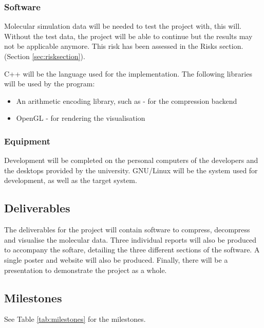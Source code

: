 \documentclass[a4paper,twocolumn]{article}
\begin{document}
\subsubsection{Software}
Molecular simulation data will be needed to test the project with, this will.
Without the test data, the project will be able to
continue but the results may not be applicable anymore. This risk has been
assessed in the Risks section. (Section \ref{sec:risksection}).

C++ will be the language used for the implementation. The following libraries
will be used by the program:
\begin{itemize}
 \item An arithmetic encoding library, such as \citep{AC} - for the compression backend 
 \item OpenGL - for rendering the visualisation
\end{itemize}


\subsubsection{Equipment}

Development will be completed on the personal computers of the developers and
the desktops provided by the university. GNU/Linux will be the system used for
development, as well as the target system.


\subsection{Deliverables}

The deliverables for the project will contain software to compress, decompress
and visualise the molecular data. Three individual reports will also be
produced to accompany the softare, detailing the three different sections of
the software. A single poster and website will also be produced. Finally, there
will be a presentation to demonstrate the project as a whole.


\subsection{Milestones}

See Table \ref{tab:milestones} for the milestones.
\end{document}
